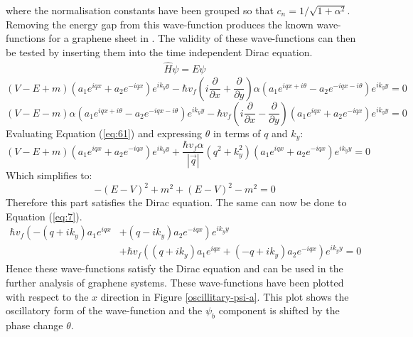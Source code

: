 			where the normalisation constants have been grouped so that $c_{n}=1/\sqrt{1+\alpha^{2}}$. Removing the energy gap from this wave-function produces the known wave-functions for a graphene sheet in \cite{b12}. The validity of these wave-functions can then be tested by inserting them into the time independent Dirac equation.
			\begin{align}
				\hat{H}\psi =E\psi
			\end{align}
			\begin{equation}\label{eq:61}
				\left(V-E+m\right)\left(a_{1}e^{iqx}+a_{2}e^{-iqx}\right)e^{ik_{y}y}-\hbar v_{f}\left(i\frac{\partial}{\partial x}+\frac{\partial}{\partial y}\right)\alpha\left(a_{1}e^{iqx+i\theta}-a_{2}e^{-iqx-i\theta}\right)e^{ik_{y}y}=0
			\end{equation}
			\begin{equation}\label{eq:7}
				\left(V-E-m\right)\alpha\left(a_{1}e^{iqx+i\theta}-a_{2}e^{-iqx-i\theta}\right)e^{ik_{y}y}-\hbar v_{f}\left(i\frac{\partial}{\partial x}-\frac{\partial}{\partial y}\right)\left(a_{1}e^{iqx}+a_{2}e^{-iqx}\right)e^{ik_{y}y}=0
			\end{equation}
			Evaluating Equation (\ref{eq:61}) and expressing $\theta$ in terms of $q$ and $k_{y}$:
			\begin{equation}
				\left(V-E+m\right)\left(a_{1}e^{iqx}+a_{2}e^{-iqx}\right)e^{ik_{y}y}+\frac{\hbar v_{f}\alpha}{|\vec{q}|}\left(q^{2}+k_{y}^{2}\right)\left(a_{1}e^{iqx}+a_{2}e^{-iqx}\right)e^{ik_{y}y}=0
			\end{equation}
			Which simplifies to:
			\begin{equation}
				-\left(E-V\right)^{2}+m^{2}+\left(E-V\right)^{2}-m^{2}=0
			\end{equation}
			Therefore this part satisfies the Dirac equation. The same can now be done to Equation (\ref{eq:7}).
			\begin{align}
				\hbar v_{f}\left(-\left(q+ik_{y}\right)a_{1}e^{iqx}\right. &+ \left. \left(q-ik_{y}\right)a_{2}e^{-iqx}\right)e^{ik_{y}y}\\
				&+\hbar v_{f}\left(\left(q+ik_{y}\right)a_{1}e^{iqx}+\left(-q+ik_{y}\right)a_{2}e^{-iqx}\right)e^{ik_{y}y}=0
			\end{align}
			Hence these wave-functions satisfy the Dirac equation and can be used in the further analysis of graphene systems. These wave-functions have been plotted with respect to the $x$ direction in Figure \ref{oscillitary-psi-a}. This plot shows the oscillatory form of the wave-function and the $\psi_{b}$ component is shifted by the phase change $\theta$.
